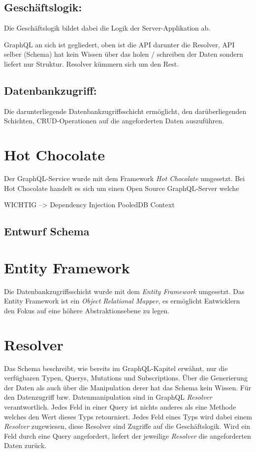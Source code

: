
\subsection{Geschäftslogik:}
Die Geschäftslogik bildet dabei die Logik der Server-Applikation ab.

GraphQL an sich ist gegliedert, oben ist die API darunter die Resolver, API selber (Schema) hat kein Wissen über das holen / schreiben der Daten sondern liefert nur Struktur.
Resolver kümmern sich um den Rest.

\subsection{Datenbankzugriff:}
Die darunterliegende Datenbankzugriffsschicht ermöglicht, den darüberliegenden Schichten, CRUD-Operationen auf die angeforderten Daten auszuführen.


\section{Hot Chocolate}
Der GraphQL-Service wurde mit dem Framework \textit{Hot Chocolate} umgesetzt.
Bei Hot Chocolate handelt es sich um einen Open Source GraphQL-Server welche 

WICHTIG --> Dependency Injection %
PooledDB Context


\subsection{Entwurf Schema}

\section{Entity Framework}
Die Datenbankzugriffsschicht wurde mit dem \textit{Entity Framework} umgesetzt.
Das Entity Framework ist ein \textit{Object Relational Mapper}, es ermöglicht Entwicklern den Fokus auf eine höhere Abstraktionsebene zu legen.

\section{Resolver}
Das Schema beschreibt, wie bereits im GraphQL-Kapitel erwähnt, nur die verfügbaren Typen, Querys, Mutations und Subscriptions.
Über die Generierung der Daten als auch über die Manipulation derer hat das Schema kein Wissen.
Für den Datenzugriff bzw. Datenmanipulation sind in GraphQL \textit{Resolver} verantwortlich.
Jedes Feld in einer Query ist nichts anderes als eine Methode welches den Wert dieses Typs retourniert.
Jedes Feld eines Typs wird dabei einem \textit{Resolver} zugewiesen, diese Resolver sind Zugriffe auf die Geschäftslogik.
Wird ein Feld durch eine Query angefordert, liefert der jeweilige \textit{Resolver} die angeforderten Daten zurück.


